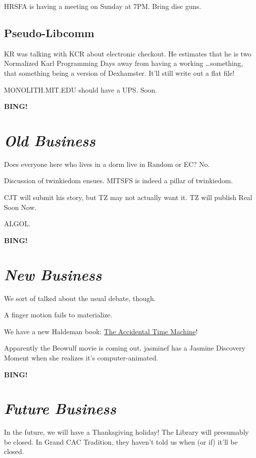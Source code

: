 \documentclass[10pt]{article}
\newcommand{\bing}{{\bf BING!} }
\newcommand{\goto}[1]{\bing \vskip 12pt \section*{{\em{#1}}}}
\begin{document}
HRSFA is having a meeting on Sunday at 7PM.  Bring disc guns.

\subsection*{Pseudo-Libcomm}

KR was talking with KCR about electronic checkout.  He estimates that he is two Normalized Karl Programming Days away from having a working \ldots something, that something being a version of Dexhamster.  It'll still write out a flat file!

MONOLITH.MIT.EDU should have a UPS.  Soon.





\goto{Old Business}

Does everyone here who lives in a dorm live in Random or EC?  No.

Discussion of twinkiedom ensues.  MITSFS is indeed a pillar of twinkiedom.

CJT will submit his story, but TZ may not actually want it.  TZ will publish Real Soon Now.

ALGOL.

\goto{New Business}

We sort of talked about the usual debate, though.

A finger motion fails to materialize.

We have a new Haldeman book: \underline{The Accidental Time Machine}!

Apparently the Beowulf movie is coming out.  jasminef has a Jasmine Discovery Moment when she realizes it's computer-animated.

\goto{Future Business}

In the future, we will have a Thanksgiving holiday!  The Library will presumably be closed.  In Grand CAC Tradition, they haven't told us when (or if) it'll be closed.
\end{document}
